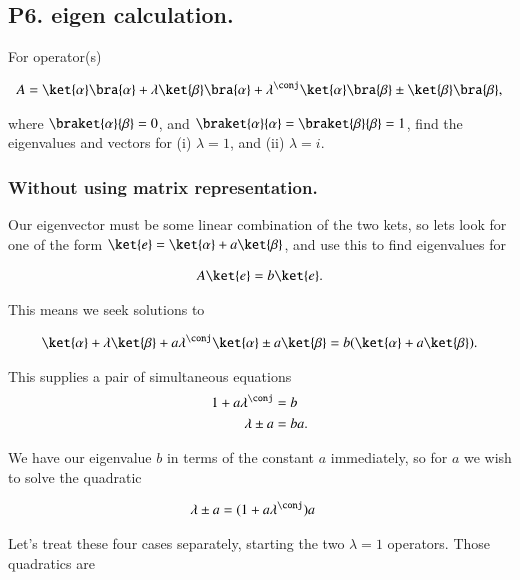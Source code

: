 \subsection{P6. eigen calculation.}

For operator(s)

\begin{align}\label{eqn:desaiDiracNotes:60}
A = 
\ket{\alpha}\bra{\alpha}
+ \lambda \ket{\beta}\bra{\alpha}
+ \lambda^\conj \ket{\alpha}\bra{\beta}
\pm \ket{\beta}\bra{\beta},
\end{align}

where $\braket{\alpha}{\beta} = 0$, and $\braket{\alpha}{\alpha} = \braket{\beta}{\beta} = 1$, find the eigenvalues and vectors for (i) $\lambda = 1$, and (ii) $\lambda = i$.

\subsubsection{Without using matrix representation.}
Our eigenvector must be some linear combination of the two kets, so lets look for one of the form $\ket{e} = \ket{\alpha} + a\ket{\beta}$, and use this to find eigenvalues for

\begin{align}\label{eqn:desaiDiracNotes:61}
A \ket{e} = b \ket{e}.
\end{align}

This means we seek solutions to

\begin{align}\label{eqn:desaiDiracNotes:62}
\ket{\alpha}
+ \lambda \ket{\beta}
+ a \lambda^\conj \ket{\alpha}
\pm a \ket{\beta}
= b ( \ket{\alpha} + a \ket{\beta} ).
\end{align}

This supplies a pair of simultaneous equations
\begin{align}\label{eqn:desaiDiracNotes:63}
1 + a \lambda^\conj &= b \\
\lambda \pm a &= b a.
\end{align}

We have our eigenvalue $b$ in terms of the constant $a$ immediately, so for $a$ we wish to solve the quadratic

\begin{align}\label{eqn:desaiDiracNotes:64}
\lambda \pm a &= (1 + a \lambda^\conj ) a
\end{align}

Let's treat these four cases separately, starting the two $\lambda = 1$ operators.  Those quadratics are

